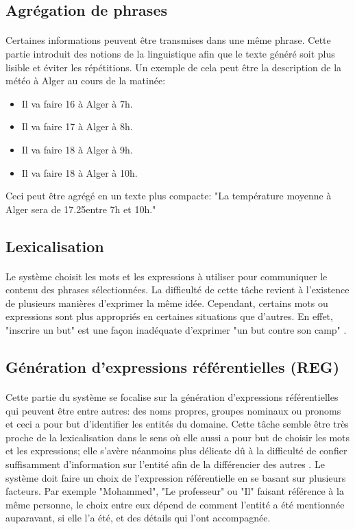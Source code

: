 \subsection{Agrégation de phrases}
\paragraph{}
Certaines informations peuvent être transmises dans une même phrase. Cette partie introduit des notions de la linguistique afin que le texte généré soit plus lisible et éviter les répétitions. Un exemple de cela peut être la description de la météo à Alger au cours de la matinée:
\begin{itemize}
	\item Il va faire 16\textdegree{} à Alger à 7h.
	\item Il va faire 17\textdegree{} à Alger à 8h.
	\item Il va faire 18\textdegree{} à Alger à 9h.
	\item Il va faire 18\textdegree{} à Alger à 10h.
\end{itemize}
Ceci peut être agrégé en un texte plus compacte: "La température moyenne à Alger sera de 17.25\textdegree entre 7h et 10h."

\subsection{Lexicalisation}
\paragraph{}Le système choisit les mots et les expressions à utiliser pour communiquer le contenu des phrases sélectionnées. La difficulté de cette tâche revient à l'existence de plusieurs manières d'exprimer la même idée. Cependant, certains mots ou expressions sont plus appropriés en certaines situations que d'autres. En effet, "inscrire un but" est une façon inadéquate d'exprimer "un but contre son camp" \citep{Gatt2018}.

\subsection{Génération d'expressions référentielles (REG)}
\paragraph{}Cette partie du système se focalise sur la génération d'expressions référentielles qui peuvent être entre autres: des noms propres, groupes nominaux ou pronoms et ceci a pour but d'identifier les entités du domaine. Cette tâche semble être très proche de la lexicalisation dans le sens où elle aussi a pour but de choisir les mots et les expressions; elle s'avère néanmoins plus délicate dû à la difficulté de confier suffisamment d'information sur l'entité afin de la différencier des autres \citep{Reiter:1997}. Le système doit faire un choix de l'expression référentielle en se basant sur plusieurs facteurs. Par exemple "Mohammed", "Le professeur" ou "Il" faisant référence à la même personne, le choix entre eux dépend de comment l'entité a été mentionnée auparavant, si elle l'a été, et des détails qui l'ont accompagnée. 

